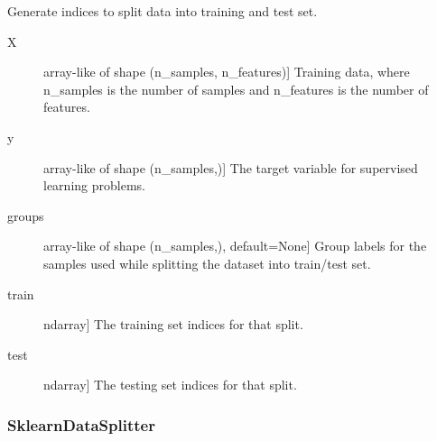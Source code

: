 \documentclass[letterpaper,10pt,english]{sphinxmanual}
\begin{document}
\begin{fulllineitems}
\begin{fulllineitems}
\end{fulllineitems}


\begin{fulllineitems}
\label{\detokenize{api/mastml.data_splitters.NoSplit:mastml.data_splitters.NoSplit.split}}
Generate indices to split data into training and test set.
\begin{description}
\item[{X}] \leavevmode{[}array-like of shape (n\_samples, n\_features){]}
Training data, where n\_samples is the number of samples
and n\_features is the number of features.

\item[{y}] \leavevmode{[}array-like of shape (n\_samples,){]}
The target variable for supervised learning problems.

\item[{groups}] \leavevmode{[}array-like of shape (n\_samples,), default=None{]}
Group labels for the samples used while splitting the dataset into
train/test set.

\end{description}
\begin{description}
\item[{train}] \leavevmode{[}ndarray{]}
The training set indices for that split.

\item[{test}] \leavevmode{[}ndarray{]}
The testing set indices for that split.

\end{description}

\end{fulllineitems}


\end{fulllineitems}



\subsubsection{SklearnDataSplitter}
\label{\detokenize{api/mastml.data_splitters.SklearnDataSplitter:sklearndatasplitter}}\label{\detokenize{api/mastml.data_splitters.SklearnDataSplitter::doc}}
\end{document}
